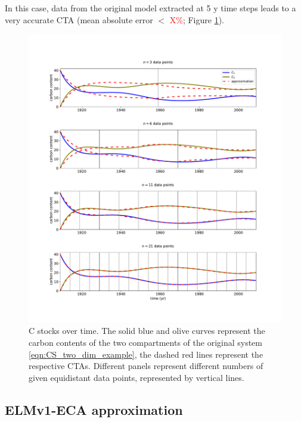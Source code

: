 \documentclass[11pt,a4paper]{article}
\newcommand{\red}[1]{\textcolor{red}{#1}}
\begin{document}
     In this case, data from the original model extracted at 5 y time steps leads to a very accurate CTA (mean absolute error $<$ \red{X\%}; Figure \ref{fig:CS_two_dim_example}).
    \begin{figure}[htbp]
        \centering 
        \includegraphics[width=1.0\linewidth]{figs/interpol_pwc_2.pdf}
        \caption{C stocks over time.
            The solid blue and olive curves represent the carbon contents of the two compartments of the original system \eqref{eqn:CS_two_dim_example}, the dashed red lines represent the respective CTAs. Different panels represent different numbers of given equidistant data points, represented by vertical lines.
            }
        \label{fig:CS_two_dim_example}
    \end{figure}        

\subsection{ELMv1-ECA approximation}
\end{document}
